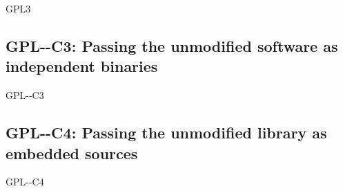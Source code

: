 \begin{license}{GPL3}
\subsection{GPL-\ver-C3: Passing the unmodified software as independent binaries} 
\begin{lsuc}{GPL-\ver-C3}

  \useCaseThree

  \begin{lsucrequires}
    \lsucmandatory{\keepLicenseElements}
    \lsucmandatory{\gplthreeEnsureCopyrightNoticeBinary}
    \lsucmandatory{\giveLicense}\passingFilesCorrectly  
    \lsucmandatory{\makeUnmodifiedSourceAvailable}
    \lsucmandatory{\describeHowToGetSource}
    \lsucmandatory{\retainCopyrightNotices}
    \lsucoptional{\addToDocumentation}
  \end{lsucrequires}

  \begin{lsucprohibits}
    \lsucitem{\noPatentLitigation}
  \end{lsucprohibits}
\end{lsuc}

\subsection{GPL-\ver-C4: Passing the unmodified library as embedded sources}
\begin{lsuc}{GPL-\ver-C4}

  \useCaseFour

  \begin{lsucrequires}
    \lsucmandatory{\keepLicenseElements}
    \lsucmandatory{\gplthreeEnsureCopyrightNoticeSource}
    \lsucmandatory{\giveLicense}\passingFilesCorrectly
    \lsucmandatory{\retainCopyrightNotices}
    \lsucmandatory{\addToCopyrightDialogLib}
    \lsucmandatory{\arrangeEnclosingSources}
    \lsucoptional{\addToDocumentation}
  \end{lsucrequires}

  \begin{lsucprohibits}
    \lsucitem{\noPatentLitigation}
  \end{lsucprohibits}
\end{lsuc}


\end{license}
